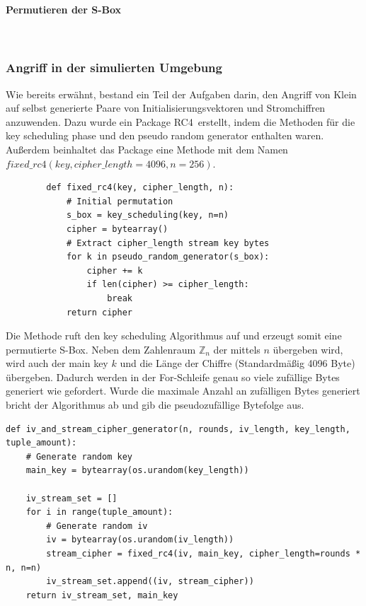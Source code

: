 \documentclass[10pt,a4paper]{article}
\begin{document}
\paragraph{Permutieren der S-Box}\ 

\subsubsection{Angriff in der simulierten Umgebung}
Wie bereits erwähnt, bestand ein Teil der Aufgaben darin, den Angriff von Klein auf selbst generierte Paare von Initialisierungsvektoren und Stromchiffren anzuwenden. Dazu wurde ein Package \glqq RC4\grqq\ erstellt, indem die Methoden für die key scheduling phase und den pseudo random generator enthalten waren. Außerdem beinhaltet das Package eine Methode mit dem Namen $fixed\_rc4(key, cipher\_length=4096, n=256)$.
\begin{lstlisting}
		def fixed_rc4(key, cipher_length, n):
    		# Initial permutation
    		s_box = key_scheduling(key, n=n)
    		cipher = bytearray()
    		# Extract cipher_length stream key bytes
    		for k in pseudo_random_generator(s_box):
        		cipher += k
        		if len(cipher) >= cipher_length:
            		break
    		return cipher
\end{lstlisting}
Die Methode ruft den key scheduling Algorithmus auf und erzeugt somit eine permutierte S-Box. Neben dem Zahlenraum $\mathbb{Z}_n$ der mittels $n$ übergeben wird, wird auch der main key $k$ und die Länge der Chiffre (Standardmäßig 4096 Byte) übergeben. Dadurch werden in der For-Schleife genau so viele zufällige Bytes generiert wie gefordert. Wurde die maximale Anzahl an zufälligen Bytes generiert bricht der Algorithmus ab und gib die pseudozufällige Bytefolge aus.
\begin{lstlisting}
def iv_and_stream_cipher_generator(n, rounds, iv_length, key_length, tuple_amount):
    # Generate random key
    main_key = bytearray(os.urandom(key_length))

    iv_stream_set = []
    for i in range(tuple_amount):
        # Generate random iv
        iv = bytearray(os.urandom(iv_length))
        stream_cipher = fixed_rc4(iv, main_key, cipher_length=rounds * n, n=n)
        iv_stream_set.append((iv, stream_cipher))
    return iv_stream_set, main_key
\end{lstlisting}
\end{document}
